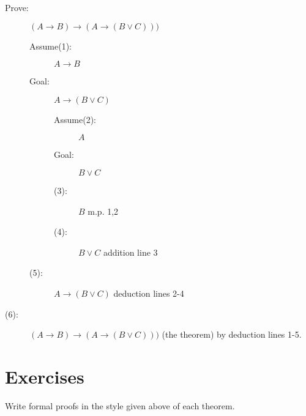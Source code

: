 \documentclass[12pt]{article}
\begin{document}
\begin{description}

\item[Prove:]  $(A \rightarrow B) \rightarrow (A \rightarrow( B \vee C)))$

\begin{description}

\item[Assume(1):]  $A \rightarrow B$

\item[Goal:]  $A \rightarrow (B \vee C)$

\begin{description}

\item[Assume(2):]  $A$

\item[Goal:]  $B \vee C$

\item[(3):]  $B$  m.p. 1,2

\item[(4):]  $B \vee C$ addition line 3

\end{description}

\item[(5):]  $A \rightarrow (B \vee C)$  deduction lines 2-4

\end{description}

\item[(6):]  $(A \rightarrow B) \rightarrow (A \rightarrow( B \vee C)))$ (the theorem) by deduction lines 1-5.

\end{description}

\newpage

\section{Exercises}

Write formal proofs in the style given above of each theorem.
\end{document}

